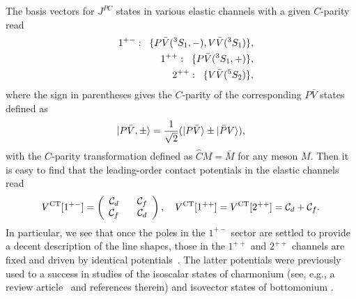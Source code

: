 \documentclass[preprint,12pt,3p]{elsarticle}
\newcommand{\be}{\begin{equation}}
\newcommand{\ee}{\end{equation}}
\begin{document}
The basis vectors for $J^{PC}$ states in various elastic channels with a given $C$-parity read 
\begin{eqnarray}
&&1^{+-}:\hspace*{0.2cm}\{P\bar{V}(^3S_1,-),V\bar{V}(^3S_1)\},\nonumber\\
&&1^{++}:\hspace*{0.2cm}\{P\bar{V}(^3S_1,+) \},\label{basisvec}\\
&&2^{++}:\hspace*{0.2cm}\{V\bar{V}(^5S_2)\},\nonumber
\end{eqnarray}
where the sign in parentheses gives the $C$-parity of the corresponding $P\bar{V}$ states defined as 
\be
\ket{P\bar{V},\pm}=\frac{1}{\sqrt{2}}(\ket{P\bar{V}}\pm\ket{\bar{P}V}),
\label{Eq:Cpar}
\ee
with the $C$-parity transformation defined as ${\hat C}M=\bar{M}$ for any meson $M$. Then it is easy to find that the leading-order contact potentials in the elastic channels read
\be
V^{\rm CT}[1^{+-}]=
\left(\begin{array}{cccc}
\mathcal{C}_d \hspace{0.3cm} & \mathcal{C}_f \\
\mathcal{C}_f \hspace{0.3cm} & \mathcal{C}_d 
\end{array}\right),\quad
V^{\rm CT}[1^{++}]=V^{\rm CT}[2^{++}]={\cal C}_d+{\cal C}_f.
\label{vfull}
\ee
In particular, we see that once the poles in the $1^{+-}$ sector are settled to provide a decent description of the line shapes, those in the $1^{++}$ and $2^{++}$ channels are fixed and driven by identical potentials~\cite{Nieves:2012tt,Baru:2016iwj}.
The latter potentials were previously used to a success in studies of the isoscalar states of charmonium (see, e.g., a review article~\cite{Guo:2017jvc} and references therein) and isovector states of bottomonium \cite{Wang:2018jlv,Baru:2019xnh,Baru:2020ywb}.
\end{document}
